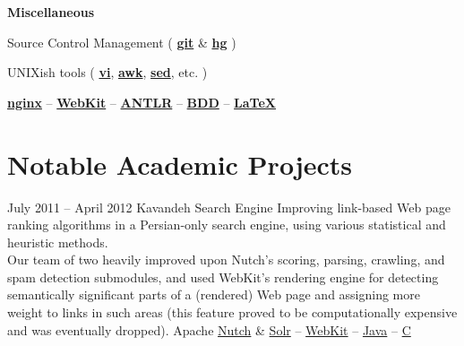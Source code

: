 \documentclass{tccv}
\newcommand{\plus}{\raisebox{.1\height}{\scalebox{.8}{+}}}
\begin{document}
{{\vspace{9pt}%
\hspace{-1pt}%
\textsf{\textbf{Miscellaneous}}

\hspace{2pt}%
Source Control Management (%
	\href{http://git-scm.com}{\bf git} \& %
	\href{http://www.selenic.com/mercurial/}{\bf hg}%
)%

\hspace{2pt}%
UNIXish tools (%
	\href{http://www.vim.org}{\bf vi}, %
	\href{http://awk.info}{\bf awk}, %
	\href{http://www.gnu.org/software/sed/}{\bf sed}, etc.%
)%

\hspace{2pt}%
	\href{http://nginx.org/en/}{\bf nginx} -- %
	\href{http://www.webkit.org}{\bf WebKit} -- %
	\href{http://www.antlr.org}{\bf ANTLR} -- %
	\href{http://en.wikipedia.org/wiki/Behavior-driven_development}{\bf BDD} -- %
	\href{http://www.latex-project.org}{\bf \LaTeX}




\newpage





\section{Notable Academic Projects}

\begin{project_list}

\item{July 2011 -- April 2012}
     {}
     {Kavandeh Search Engine}
	 {Improving link-based Web page ranking algorithms in a Persian-only search engine, using various statistical and heuristic methods.
	 \\[1.5pt]
	 Our team of two heavily improved upon Nutch's \mbox{scoring}, parsing, crawling, and spam detection submodules, and used WebKit's rendering engine for detecting \mbox{semantically} significant parts of a (rendered) Web page and \mbox{assigning} more weight to links in such areas (this feature proved to be computationally expensive and was eventually dropped).}
     {%
     	Apache \href{http://nutch.apache.org}{Nutch} \&
		\href{http://lucene.apache.org/solr/}{Solr} -- %
		\href{http://www.webkit.org}{WebKit} -- %
		\href{http://www.oracle.com/technetwork/java/}{Java} -- %
		\href{https://en.wikipedia.org/wiki/C\%2B\%2B}{C\plus\plus}%
	}

\vspace{-6pt}


\end{project_list}}}
\end{document}
